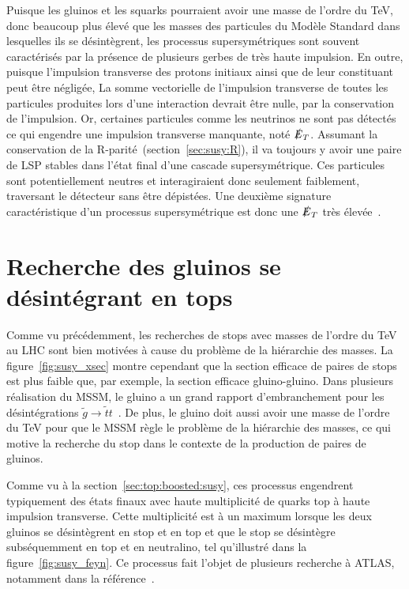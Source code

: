 Puisque les gluinos et les squarks pourraient avoir une masse de
l'ordre du TeV, donc beaucoup plus élevé que les masses des particules
du Modèle Standard dans lesquelles ils se désintègrent, les processus
supersymétriques sont souvent caractérisés par la présence de
plusieurs gerbes de très haute impulsion. En outre, puisque
l'impulsion transverse des protons initiaux ainsi que de leur
constituant peut être négligée, La somme vectorielle de l'impulsion
transverse de toutes les particules produites lors d'une interaction
devrait être nulle, par la conservation de l'impulsion. Or, certaines
particules comme les neutrinos ne sont pas détectés ce qui engendre
une impulsion transverse manquante, noté $\slashed{E}_T$. Assumant la
conservation de la R-parité~(section~\ref{sec:susy:R}), il va toujours
y avoir une paire de LSP stables dans l'état final d'une
cascade supersymétrique. Ces particules sont potentiellement neutres et
interagiraient donc seulement faiblement, traversant le détecteur sans
être dépistées. Une deuxième signature caractéristique d'un processus
supersymétrique est donc une $\slashed{E}_T$ très
élevée~\cite{olive_susy2_2014}.


\section{Recherche des gluinos se désintégrant en tops}
\label{sec:susy_atlas:gtt}

Comme vu précédemment, les recherches de stops avec masses de l'ordre
du TeV au LHC sont bien motivées à cause du problème de la hiérarchie
des masses. La figure~\ref{fig:susy_xsec} montre cependant que la
section efficace de paires de stops est plus faible que, par exemple,
la section efficace gluino-gluino. Dans plusieurs réalisation du MSSM,
le gluino a un grand rapport d'embranchement pour les désintégrations
$\tilde{g} \rightarrow \tilde{t} t$~\cite{bandyopadhyay_boosted_2011}.
De plus, le gluino doit aussi avoir une masse de l'ordre du TeV pour
que le MSSM règle le problème de la hiérarchie des masses, ce qui
motive la recherche du stop dans le contexte de la production de
paires de gluinos.

Comme vu à la section~\ref{sec:top:boosted:susy}, ces processus
engendrent typiquement des états finaux avec haute multiplicité de
quarks top à haute impulsion transverse. Cette multiplicité est à un
maximum lorsque les deux gluinos se désintègrent en stop et en top et
que le stop se désintègre subséquemment en top et en neutralino, tel
qu'illustré dans la figure~\ref{fig:susy_feyn}. Ce processus fait l'objet
de plusieurs recherche à ATLAS, notamment dans la référence~\cite{ATLAS-CONF-2015-067}.

